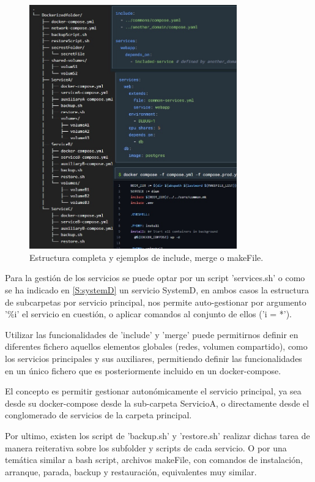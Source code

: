 {\begin{figure}[!htb]
\begin{center}
\includegraphics[width=0.8\textwidth]{./figuras/Ejemplos_estrcutura}
\caption{Estructura completa y ejemplos de include, merge o makeFile.}
\label{F:Ejemplos_estrcutura}
\end{center}
\end{figure}
Para la gestión de los servicios se puede optar por un script 'services.sh' o como se ha indicado en \ref{S:systemD} un servicio SystemD, en ambos casos la estructura de subcarpetas por servicio principal, nos permite auto-gestionar por argumento '\%i' el servicio en cuestión, o aplicar comandos al conjunto de ellos ('i = *').

Utilizar las funcionalidades de 'include'\cite{c_docker_compose_include} y 'merge'\cite{c_docker_compose_merge} puede permitirnos definir en diferentes fichero aquellos elementos globales (redes, volumen compartido), como los servicios principales y sus auxiliares, permitiendo definir las funcionalidades en un único fichero que es posteriormente incluido en un docker-compose.

El concepto es permitir gestionar autonómicamente el servicio principal, ya sea desde su docker-compose desde la sub-carpeta ServicioA, o directamente desde el conglomerado de servicios de la carpeta principal.

Por ultimo, existen los script de 'backup.sh' y 'restore.sh' realizar dichas tarea de manera reiterativa sobre los subfolder y scripts de cada servicio. O por una temática similar a bash script, archivos makeFile, con comandos de instalación, arranque, parada, backup y restauración, equivalentes muy similar.

}
